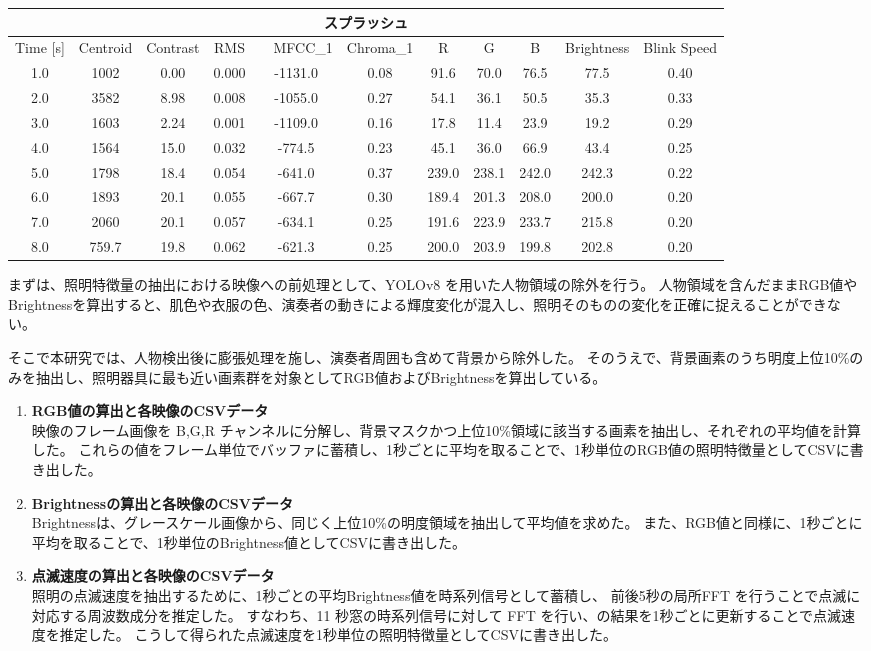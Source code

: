\begin{table}[t]
\begin{tabular}{c|cccccccccc}
\hline
\multicolumn{11}{c}{スプラッシュ} \\
\hline
\hline
Time [s] & Centroid & Contrast & RMS &　MFCC\_1 & Chroma\_1 & R & G & B
 & Brightness & Blink Speed  \\
\hline
1.0 & 1002 & 0.00 & 0.000 & -1131.0 & 0.08 & 91.6 & 70.0 & 76.5 & 77.5 & 0.40 \\
2.0 & 3582 & 8.98 & 0.008 & -1055.0 & 0.27 & 54.1 & 36.1 & 50.5 & 35.3 & 0.33 \\
3.0 & 1603 & 2.24 & 0.001 & -1109.0 & 0.16 & 17.8 & 11.4 & 23.9 & 19.2 & 0.29 \\
4.0 & 1564 & 15.0 & 0.032 & -774.5 & 0.23 & 45.1 & 36.0 & 66.9 & 43.4 & 0.25 \\
5.0 & 1798 & 18.4 & 0.054 & -641.0 & 0.37 & 239.0 & 238.1 & 242.0 & 242.3 & 0.22 \\
6.0 & 1893 & 20.1 & 0.055 & -667.7 & 0.30 & 189.4 & 201.3 & 208.0 & 200.0 & 0.20 \\
7.0 & 2060 & 20.1 & 0.057 & -634.1 & 0.25 & 191.6 & 223.9 & 233.7 & 215.8 & 0.20 \\
8.0 & 759.7 & 19.8 & 0.062 & -621.3 & 0.25 & 200.0 & 203.9 & 199.8 & 202.8 & 0.20 \\
\hline
\end{tabular}
\end{table}

まずは、照明特徴量の抽出における映像への前処理として、YOLOv8\cite{YOLOv8StateoftheArtComputer} を用いた人物領域の除外を行う。
人物領域を含んだままRGB値やBrightnessを算出すると、肌色や衣服の色、演奏者の動きによる輝度変化が混入し、照明そのものの変化を正確に捉えることができない。

そこで本研究では、人物検出後に膨張処理を施し、演奏者周囲も含めて背景から除外した。
そのうえで、背景画素のうち明度上位10\%のみを抽出し、照明器具に最も近い画素群を対象としてRGB値およびBrightnessを算出している。

\begin{enumerate}
	\item \textbf{RGB値の算出と各映像のCSVデータ}　\\
        映像のフレーム画像を B,G,R チャンネルに分解し、背景マスクかつ上位10\%領域に該当する画素を抽出し、それぞれの平均値を計算した。
        これらの値をフレーム単位でバッファに蓄積し、1秒ごとに平均を取ることで、1秒単位のRGB値の照明特徴量としてCSVに書き出した。
	\item \textbf{Brightnessの算出と各映像のCSVデータ}　\\
	    Brightnessは、グレースケール画像から、同じく上位10\%の明度領域を抽出して平均値を求めた。
		また、RGB値と同様に、1秒ごとに平均を取ることで、1秒単位のBrightness値としてCSVに書き出した。
    \item \textbf{点滅速度の算出と各映像のCSVデータ}　\\
        照明の点滅速度を抽出するために、1秒ごとの平均Brightness値を時系列信号として蓄積し、
        前後5秒の局所FFT を行うことで点滅に対応する周波数成分を推定した。
		すなわち、11 秒窓の時系列信号に対して FFT を行い、の結果を1秒ごとに更新することで点滅速度を推定した。
		こうして得られた点滅速度を1秒単位の照明特徴量としてCSVに書き出した。
\end{enumerate}

